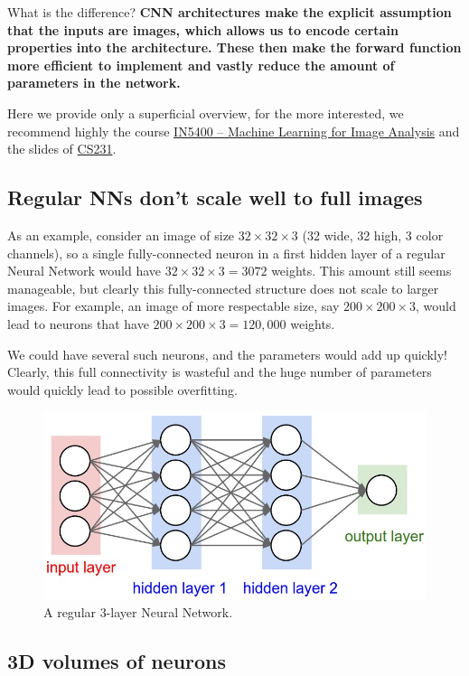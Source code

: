 \documentclass[%
oneside,                 %
final,                   %
10pt]{article}
\begin{document}
What is the difference? \textbf{CNN architectures make the explicit assumption that
the inputs are images, which allows us to encode certain properties
into the architecture. These then make the forward function more
efficient to implement and vastly reduce the amount of parameters in
the network.}

Here we provide only a superficial overview, for the more interested, we recommend highly the course
\href{{https://www.uio.no/studier/emner/matnat/ifi/IN5400/index-eng.html}}{IN5400 – Machine Learning for Image Analysis}
and the slides of \href{{http://cs231n.github.io/convolutional-networks/}}{CS231}.

\subsection*{Regular NNs don’t scale well to full images}

As an example, consider
an image of size $32\times 32\times 3$ (32 wide, 32 high, 3 color channels), so a
single fully-connected neuron in a first hidden layer of a regular
Neural Network would have $32\times 32\times 3 = 3072$ weights. This amount still
seems manageable, but clearly this fully-connected structure does not
scale to larger images. For example, an image of more respectable
size, say $200\times 200\times 3$, would lead to neurons that have 
$200\times 200\times 3 = 120,000$ weights. 

We could have
several such neurons, and the parameters would add up quickly! Clearly,
this full connectivity is wasteful and the huge number of parameters
would quickly lead to possible overfitting.


\begin{figure}[!ht]  %
  \centerline{\includegraphics[width=0.6\linewidth]{figslides/nn.jpeg}}
  \caption{
  A regular 3-layer Neural Network.
  }
\end{figure}


\subsection*{3D volumes of neurons}
\end{document}
